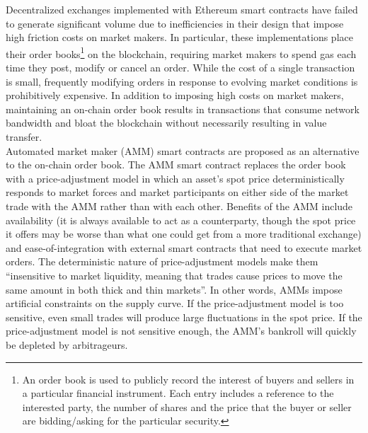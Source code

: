 \documentclass[10pt]{article}
\begin{document}
Decentralized exchanges implemented with Ethereum smart contracts have failed to generate significant volume due to inefficiencies in their design that impose high friction costs on market makers. In particular, these implementations place their order books\footnote{An order book is used to publicly record the interest of buyers and sellers in a particular financial instrument. Each entry includes a reference to the interested party, the number of shares and the price that the buyer or seller are bidding/asking for the particular security. } on the blockchain\cite{maker, etheropt, augur, itt}, requiring market makers to spend gas each time they post, modify or cancel an order. While the cost of a single transaction is small, frequently modifying orders in response to evolving market conditions is prohibitively expensive. In addition to imposing high costs on market makers, maintaining an on-chain order book results in transactions that consume network bandwidth and bloat the blockchain without necessarily resulting in value transfer. \\

\noindent Automated market maker (AMM) smart contracts are proposed\cite{euler, bancor} as an alternative to the on-chain order book. The AMM smart contract replaces the order book with a price-adjustment model in which an asset's spot price deterministically responds to market forces and market participants on either side of the market trade with the AMM rather than with each other. Benefits of the AMM include availability (it is always available to act as a counterparty, though the spot price it offers may be worse than what one could get from a more traditional exchange) and ease-of-integration with external smart contracts that need to execute market orders. The deterministic nature of price-adjustment models make them “insensitive to market liquidity, meaning that trades cause prices to move the same amount in both thick and thin markets”\cite{othman2013practical}. In other words, AMMs impose artificial constraints on the supply curve. If the price-adjustment model is too sensitive, even small trades will produce large fluctuations in the spot price. If the price-adjustment model is not sensitive enough, the AMM’s bankroll will quickly be depleted by arbitrageurs. \\

\end{document}
